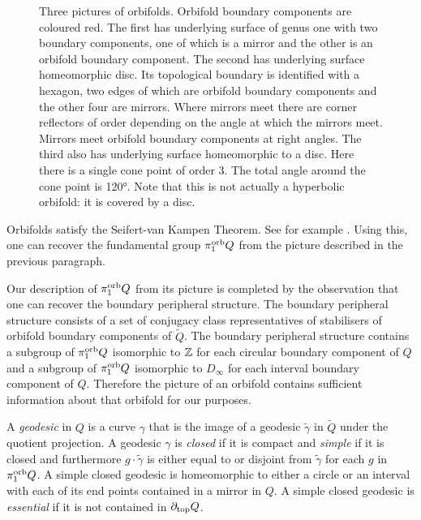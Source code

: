\begin{figure}
  \begin{center} 
    
  \end{center}
  \caption{
    Three pictures of orbifolds.
    Orbifold boundary components are coloured red.
    The first has underlying surface of genus one with two boundary components, one of which is a mirror and the other is an orbifold boundary component.
    The second has underlying surface homeomorphic disc.
    Its topological boundary is identified with a hexagon, two edges of which are orbifold boundary components and the other four are mirrors.
    Where mirrors meet there are corner reflectors of order depending on the angle at which the mirrors meet.
    Mirrors meet orbifold boundary components at right angles.
    The third also has underlying surface homeomorphic to a disc.
    Here there is a single cone point of order 3.
    The total angle around the cone point is \ang{120}.
    Note that this is not actually a hyperbolic orbifold: it is covered by a disc.
  }
  \label{figure:orbifold}
\end{figure}

Orbifolds satisfy the Seifert-van Kampen Theorem.
See for example \cite[Corollary 2.3]{boileaumaillotporti03}.
Using this, one can recover the fundamental group $\pi_1^{\mathrm{orb}} Q$ from the picture described in the previous paragraph.

Our description of $\pi_1^{\mathrm{orb}} Q$ from its picture is completed by the observation that one can recover the boundary peripheral structure.
The boundary peripheral structure consists of a set of conjugacy class representatives of stabilisers of orbifold boundary components of $\widetilde{Q}$.
The boundary peripheral structure contains a subgroup of $\pi_1^{\mathrm{orb}} Q$ isomorphic to $\mathbb{Z}$ for each circular boundary component of $Q$ and a subgroup of $\pi_1^{\mathrm{orb}} Q$ isomorphic to $D_\infty$ for each interval boundary component of $Q$.
Therefore the picture of an orbifold contains sufficient information about that orbifold for our purposes.

\begin{definition}
  A \emph{geodesic} in $Q$ is a curve $\gamma$ that is the image of a geodesic $\widetilde\gamma$ in $\widetilde{Q}$ under the quotient projection. 
  A geodesic $\gamma$ is \emph{closed} if it is compact and \emph{simple} if it is closed and furthermore $g\cdot\widetilde\gamma$ is either equal to or disjoint from $\widetilde\gamma$ for each $g$ in $\pi_1^{\mathrm{orb}} Q$. 
  A simple closed geodesic is homeomorphic to either a circle or an interval with each of its end points contained in a mirror in $Q$. 
  A simple closed geodesic is \emph{essential} if it is not contained in $\partial_{\mathrm{top}} Q$. 
\end{definition}

